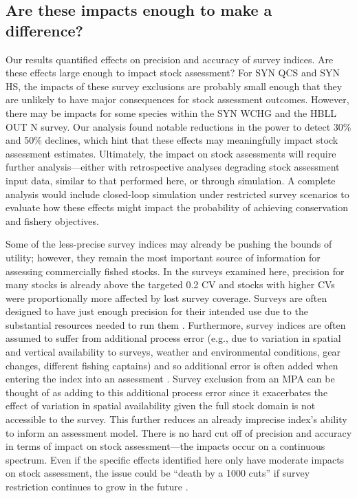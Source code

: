 \documentclass[12pt]{article}
\newcommand{\R}[1]{\label{#1}\linelabel{#1}}
\begin{document}
\begin{spacing}{1.4}
\subsection*{Are these impacts enough to make a difference?}

Our results quantified effects on precision and accuracy of survey indices.
Are these effects large enough to impact stock assessment?
For SYN QCS and SYN HS, the impacts of these survey exclusions are probably small enough that they are unlikely to have major consequences for stock assessment outcomes.
However, there may be impacts for some species within the SYN WCHG and the HBLL OUT N survey.
Our analysis found notable reductions in the power to detect 30\% and 50\% declines, which hint that these effects may meaningfully impact stock assessment estimates.
Ultimately, the impact on stock assessments will require further analysis---either with retrospective analyses degrading stock assessment input data, similar to that performed here, or through simulation.
A complete analysis would include closed-loop simulation \citep{punt2016} under restricted survey scenarios to evaluate how these effects might impact the probability of achieving conservation and fishery objectives.

Some of the less-precise survey indices may already be pushing the bounds of utility; however, they remain the most important source of information for assessing commercially fished stocks.
In the surveys examined here, precision for many stocks is already above the targeted \citep{sinclair2003syn} 0.2 CV and stocks with higher CVs were proportionally more affected by lost survey coverage.
Surveys are often designed to have just enough precision for their intended use due to the substantial resources needed to run them \citep{hilbornwalters1992}.
Furthermore, survey indices are often assumed to suffer from additional process error \R{E3a} (e.g., due to variation in spatial and vertical availability to surveys, weather and environmental conditions, gear changes, different fishing captains) and so additional error is often added when entering the index into an assessment \citep{pennington1994, francis2003}.
\R{E3b}Survey exclusion from an MPA can be thought of as adding to this additional process error since it exacerbates the effect of variation in spatial availability given the full stock domain is not accessible to the survey.
This further reduces an already imprecise index's ability to inform an assessment model.
There is no hard cut off of precision and accuracy in terms of impact on stock assessment---the impacts occur on a continuous spectrum.
Even if the specific effects identified here only have moderate impacts on stock assessment, the issue could be ``death by a 1000 cuts'' if survey restriction continues to grow in the future \citep{benoit2020national}.


\end{spacing}
\end{document}
